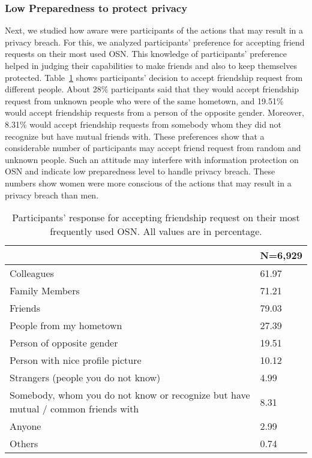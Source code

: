 \subsubsection{Low Preparedness to protect privacy}
Next, we studied how aware were participants of the actions that may result in a privacy breach. For this, we analyzed participants' preference for accepting friend requests on their most used OSN. This knowledge of participants' preference helped in judging their capabilities to make friends and also to keep themselves protected. Table~\ref{tab:acceptfriendrequest} shows participants' decision to accept friendship request from different people. About 28\% participants said that they would accept friendship request from unknown people who were of the same hometown, and 19.51\% would accept friendship requests from a person of the opposite gender. Moreover, 8.31\% would accept friendship requests from somebody whom they did not recognize but have mutual friends with. These preferences show that a considerable number of participants may accept friend request from random and unknown people. Such an attitude may interfere with information protection on OSN and indicate low preparedness level to handle privacy breach. These numbers show women were more conscious of the actions that may result in a privacy breach than men.


\begin{table}[!htbp]
\caption{ \small{Participants' response for accepting friendship request on their most frequently used OSN. All values are in percentage.}}
\centering
\small
\setlength{\extrarowheight}{2pt}
\begin{tabular}{p{5cm}p{2cm}}
\hline
\midrule
& N=6,929\\
\hline
Colleagues &61.97\\
\rowcolor {gray!15 } 
Family Members&71.21\\
Friends&79.03\\
\rowcolor {gray!15 } 
People from my hometown&27.39\\
Person of opposite gender&19.51\\
\rowcolor {gray!15 } 
Person with nice profile picture&10.12\\
Strangers (people you do not know) &4.99\\
\rowcolor {gray!15 } 
Somebody, whom you do not know or recognize but have mutual / common friends with &8.31\\
Anyone&2.99\\
\rowcolor {gray!15 } 
Others&0.74\\
\midrule
\hline
\end{tabular}
\vspace{-1mm}
\label{tab:acceptfriendrequest}
\end{table}


